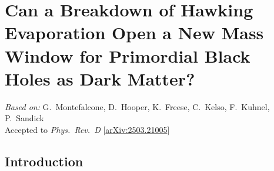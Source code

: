 \chapter{Can a Breakdown of Hawking Evaporation Open a New Mass Window for Primordial Black Holes as Dark Matter?}
\label{ch:pbh-memory-burden}

\begin{center}
\textit{Based on:} G.~Montefalcone, D.~Hooper, K.~Freese, C.~Kelso, F.~Kuhnel, P.~Sandick\\
Accepted to \textit{Phys.\ Rev.\ D}
[\href{https://arxiv.org/abs/2503.21005}{arXiv:2503.21005}]
\end{center}
\vspace{1em}

\newcommand{\gsim}{\raisebox{-0.13cm}{~\shortstack{$>$ \\[-0.07cm]
      $\sim$}}~}
\newcommand{\lsim}{\raisebox{-0.13cm}{~\shortstack{$<$ \\[-0.07cm]
      $\sim$}}~}


\section{Introduction}
\label{sec:ch10-intro}

